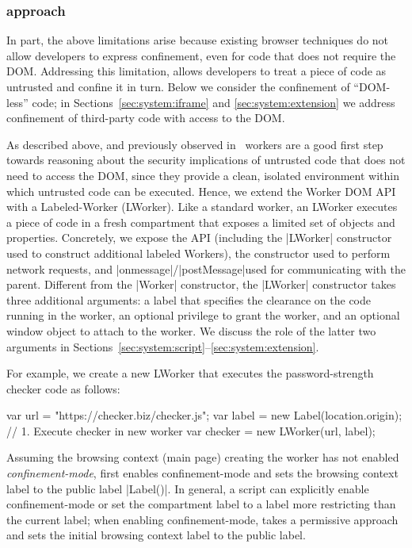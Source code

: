 \subsubsection{\sys{} approach}
%
In part, the above limitations arise because existing browser
techniques do not allow developers to express confinement, even for
code that does not require the DOM.
%
%
Addressing this limitation, \sys{} allows developers to treat a piece
of code as untrusted and confine it in turn.
%
Below we consider the confinement of ``DOM-less'' code; in
Sections~\ref{sec:system:iframe} and \ref{sec:system:extension} we
address confinement of third-party code with access to the DOM.

As described above, and previously observed in~\cite{Ingram:2012}
workers are a good first step towards reasoning about the security
implications of untrusted code that does not need to access the DOM,
since they provide a clean, isolated environment within which
untrusted code can be executed.
%
Hence, we extend the Worker DOM API~\cite{workers} with a
Labeled-Worker (LWorker).
%
Like a standard worker, an LWorker executes a piece of code in a fresh
compartment that exposes a limited set of objects and properties.
%
Concretely, we expose the \sys{} API (including the \js|LWorker|
constructor used to construct additional labeled Workers), the \xhr{}
constructor used to perform network requests, and
\js|onmessage|/\js|postMessage|used for communicating with the
parent.
%
Different from the \js|Worker| constructor, the \js|LWorker|
constructor takes three additional arguments: a label that specifies the
clearance on the code running in the worker, an optional privilege
to grant the worker, and an optional window object to attach to the worker.
%
We discuss the role of the latter two arguments in Sections~\ref{sec:system:script}--\ref{sec:system:extension}.

For example, we create a new LWorker that executes the
password-strength checker code as follows:
\begin{jscode}
var url = "https://checker.biz/checker.js";
var label = new Label(location.origin);
// 1. Execute checker in new worker
var checker = new LWorker(url, label);
\end{jscode}
%
Assuming the browsing context (main page) creating the worker has not
enabled \emph{confinement-mode}, \sys{} first enables confinement-mode
and sets the browsing context label to the public label \js|Label()|.
%
In general, a script can explicitly enable confinement-mode or set
the compartment label to a label more restricting than the current
label; when enabling confinement-mode, \sys{} takes a
permissive approach and sets the initial browsing context label to the
public label.
 
